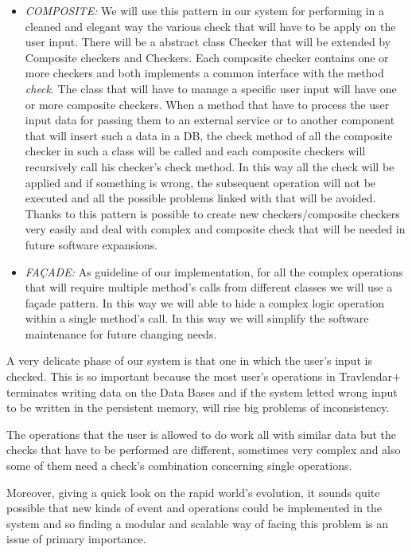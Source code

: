 \begin{itemize}
\item \emph{COMPOSITE:} We will use this pattern in our system for performing in a cleaned and elegant way the various check that will have to be apply on the user input. There will be a abstract class Checker that will be extended by Composite checkers and Checkers. Each composite checker contains one or more checkers and both implements a common interface with the method \emph{check}. The class that will have to manage a specific user input will have one or more composite checkers.
When a method that have to process the user input data for passing them to an external service or to another component that will insert such a data in a DB, the check method of all the composite checker in such a class will be called and each composite checkers will recursively call his checker’s check method. In this way all the check will be applied and if something is wrong, the subsequent operation will not be executed and all the possible problems linked with that will be avoided. 
Thanks to this pattern is possible to create new checkers/composite checkers very easily and deal with complex and composite check that will be needed in future software expansions.

\item \emph{FAÇADE:} As guideline of our implementation, for all the complex operations that will require multiple method’s calls from different classes we will use a façade pattern. In this way we will able to hide a complex logic operation within a single method’s call. In this way we will simplify the software maintenance for future changing needs.
\end{itemize}

A very delicate phase of our system is that one in which the user's input is checked. This is so important because the most user’s operations in Travlendar+ terminates writing data on the Data Bases and if the system letted wrong input to be written in the persistent memory, will rise big problems of inconsistency.

The operations that the user is allowed to do work all with similar data but the checks that have to be performed are different, sometimes very complex and also some of them need a check’s combination concerning single operations.

Moreover, giving a quick look on the rapid world’s evolution, it sounds quite possible that new kinds of event and operations could be implemented in the system and so finding a modular and scalable way of facing this problem is an issue of primary importance.

